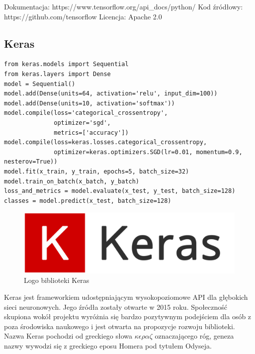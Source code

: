 \documentclass[12pt,a4paper,twoside,titlepage,openright]{book}
\begin{document}
\noindent
\newline 
Dokumentacja: https://www.tensorflow.org/api\_docs/python/
\newline 
Kod źródłowy: https://github.com/tensorflow
\newline 
Licencja: Apache 2.0

\subsection{Keras}


\noindent
\begin{minipage}{\linewidth}
\begin{lstlisting}[caption=Skrypt najprostszego modelu sekwencyjnego (Keras w 30 sekund), label=lst:test]
from keras.models import Sequential
from keras.layers import Dense
model = Sequential()
model.add(Dense(units=64, activation='relu', input_dim=100))
model.add(Dense(units=10, activation='softmax'))
model.compile(loss='categorical_crossentropy',
              optimizer='sgd',
              metrics=['accuracy'])
model.compile(loss=keras.losses.categorical_crossentropy,
              optimizer=keras.optimizers.SGD(lr=0.01, momentum=0.9, nesterov=True))
model.fit(x_train, y_train, epochs=5, batch_size=32)
model.train_on_batch(x_batch, y_batch)
loss_and_metrics = model.evaluate(x_test, y_test, batch_size=128)
classes = model.predict(x_test, batch_size=128)
\end{lstlisting}
\end{minipage}

\begin{figure}[ht]
	\centering
			\includegraphics[resolution=100, scale=0.3]{Keras.png}
		\caption{Logo biblioteki Keras}
\end{figure}

Keras jest frameworkiem udostępniającym wysokopoziomowe API dla głębokich sieci neuronowych. Jego źródła zostały otwarte w 2015 roku. Społeczność skupiona wokół projektu wyróżnia się bardzo pozytywnym podejściem dla osób z poza środowiska naukowego i jest otwarta na propozycje rozwoju biblioteki. Nazwa Keras pochodzi od greckiego słowa \(\kappa\epsilon\rho\alpha\zeta\) oznaczającego róg, geneza nazwy wywodzi się z greckiego eposu Homera pod tytułem Odyseja.
\end{document}
